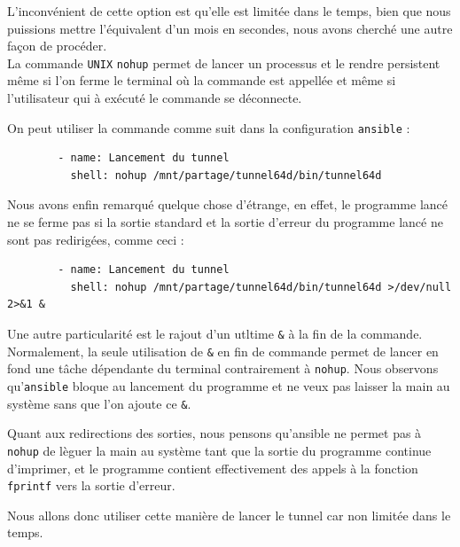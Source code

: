 \documentclass[a4paper, 10pt]{article}
\begin{document}
      L'inconvénient de cette option est qu'elle est limitée dans le temps, bien
      que nous puissions mettre l'équivalent d'un mois en secondes, nous avons
      cherché une autre façon de procéder. \\

      La commande \verb+UNIX+ \verb+nohup+ permet de lancer un processus et le
      rendre persistent même si l'on ferme le terminal où la commande est
      appellée et même si l'utilisateur qui à exécuté le commande se déconnecte.

      On peut utiliser la commande comme suit dans la configuration
      \verb+ansible+ :

      \begin{verbatim}
        - name: Lancement du tunnel
          shell: nohup /mnt/partage/tunnel64d/bin/tunnel64d
      \end{verbatim}

      Nous avons enfin remarqué quelque chose d'étrange, en effet, le programme
      lancé ne se ferme pas si la sortie standard et la sortie d'erreur du
      programme lancé ne sont pas redirigées, comme ceci :

      \begin{verbatim}
        - name: Lancement du tunnel
          shell: nohup /mnt/partage/tunnel64d/bin/tunnel64d >/dev/null 2>&1 &
      \end{verbatim}

      Une autre particularité est le rajout d'un utltime \verb+&+ à la fin de la
      commande. Normalement, la seule utilisation de \verb+&+ en fin de commande
      permet de lancer en fond une tâche dépendante du terminal contrairement à
      \verb+nohup+. Nous observons qu'\verb+ansible+ bloque au lancement du
      programme et ne veux pas laisser la main au système sans que l'on ajoute
      ce \verb+&+.

      Quant aux redirections des sorties, nous pensons qu'ansible ne permet pas
      à \verb+nohup+ de lèguer la main au système tant que la sortie du
      programme continue d'imprimer, et le programme contient effectivement des
      appels à la fonction \verb+fprintf+ vers la sortie d'erreur.

      Nous allons donc utiliser cette manière de lancer le tunnel car non
      limitée dans le temps.
\end{document}
